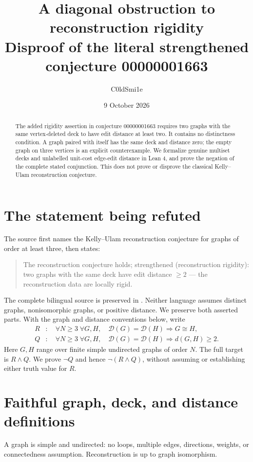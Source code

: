 \documentclass[11pt]{article}
\title{A diagonal obstruction to reconstruction rigidity\\[0.4em]\large Disproof of the literal strengthened conjecture 00000001663}
\author{C0ldSmi1e}
\date{9 October 2026}
\newcommand{\deck}{\mathcal D}
\newcommand{\code}[1]{\texttt{\detokenize{#1}}}
\begin{document}
\maketitle
\begin{abstract}
The added rigidity assertion in conjecture 00000001663 requires two graphs with the same vertex-deleted deck to have edit distance at least two. It contains no distinctness condition. A graph paired with itself has the same deck and distance zero; the empty graph on three vertices is an explicit counterexample. We formalize genuine multiset decks and unlabelled unit-cost edge-edit distance in Lean 4, and prove the negation of the complete stated conjunction. This does not prove or disprove the classical Kelly--Ulam reconstruction conjecture.
\end{abstract}

\section{The statement being refuted}
The source first names the Kelly--Ulam reconstruction conjecture for graphs of order at least three, then states:
\begin{quote}
The reconstruction conjecture holds; strengthened (reconstruction rigidity): two graphs with the same deck have edit distance $\geq 2$ --- the reconstruction data are locally rigid.
\end{quote}
The complete bilingual source is preserved in \code{source/ORIGINAL.md}. Neither language assumes distinct graphs, nonisomorphic graphs, or positive distance. We preserve both asserted parts. With the graph and distance conventions below, write
\begin{align*}
R &: \quad \forall N\geq3\;\forall G,H,\quad \deck(G)=\deck(H)\Longrightarrow G\cong H,\\
Q &: \quad \forall N\geq3\;\forall G,H,\quad \deck(G)=\deck(H)\Longrightarrow d(G,H)\geq2.
\end{align*}
Here $G,H$ range over finite simple undirected graphs of order $N$. The full target is $R\land Q$. We prove $\neg Q$ and hence $\neg(R\land Q)$, without assuming or establishing either truth value for $R$.

\section{Faithful graph, deck, and distance definitions}
A graph is simple and undirected: no loops, multiple edges, directions, weights, or connectedness assumption. Reconstruction is up to graph isomorphism.
\end{document}
